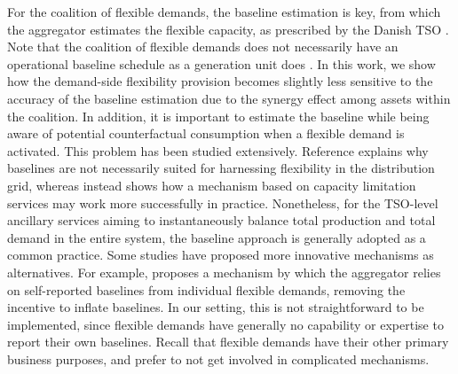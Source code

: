 \documentclass[conference]{IEEEtran}
\begin{document}
For the coalition of flexible demands, the baseline estimation is key, from which the aggregator estimates the flexible capacity, as prescribed by the Danish TSO \cite{energinet:prequalification}. Note that the coalition of flexible demands does not necessarily have an operational baseline schedule as a generation unit does \cite{gade2022ecosystem}.
%
In this work, we show how the demand-side flexibility provision becomes slightly less sensitive to the accuracy of the baseline estimation due to the synergy effect among assets within the coalition. 
In addition, it is important to estimate the baseline while being aware of potential counterfactual consumption when a flexible demand is activated. This problem has been studied extensively. Reference \cite{ziras2021baselines} explains why baselines are not necessarily suited for harnessing flexibility in the distribution grid, whereas \cite{capacity_limitation_services} instead shows how a mechanism based on capacity limitation services may work more successfully in practice. Nonetheless, for the TSO-level ancillary services aiming to instantaneously balance total production and total demand in the entire system, the baseline approach is generally adopted as a common practice. Some studies have proposed more innovative mechanisms as alternatives. For example,  \cite{muthirayan2019mechanism} proposes a mechanism by which the aggregator relies on self-reported baselines from individual flexible demands, removing the incentive to inflate baselines. In our setting, this is not straightforward to be implemented, since flexible demands have generally no capability or expertise to report their own baselines. Recall that flexible demands have their other primary business purposes, and prefer to not get involved in complicated mechanisms.



\end{document}
